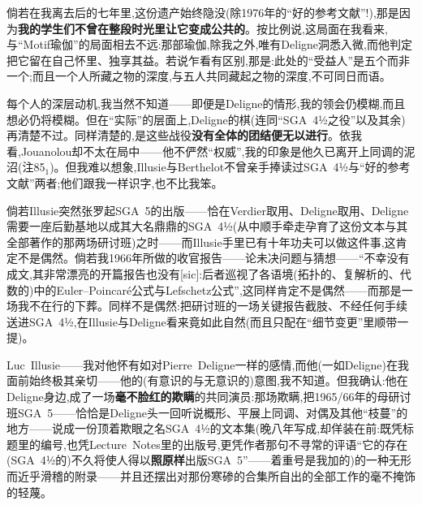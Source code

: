 倘若在我离去后的七年里,这份遗产始终隐没(除1976年的“好的参考文献”!),那是因为\textbf{我的学生们不曾在整段时光里让它变成公共的}。按比例说,这局面在我看来,与“Motif瑜伽”的局面相去不远:那部瑜伽,除我之外,唯有Deligne洞悉入微,而他判定把它留在自己怀里、独享其益。若说乍看有区别,那是:此处的“受益人”是五个而非一个;而且一个人所藏之物的深度,与五人共同藏起之物的深度,不可同日而语。

每个人的深层动机,我当然不知道——即便是Deligne的情形,我的领会仍模糊,而且想必仍将模糊。但在“实际”的层面上,Deligne的棋(连同“SGA~4½之役”以及其余)再清楚不过。同样清楚的,是这些战役\textbf{没有全体的团结便无以进行}。依我看,Jouanolou却不太在局中——他不俨然“权威”,我的印象是他久已离开上同调的泥沼(注85$_{1}$)。但我难以想象,Illusie与Berthelot不曾亲手捧读过SGA~4½与“好的参考文献”两者;他们跟我一样识字,也不比我笨。

倘若Illusie突然张罗起SGA~5的出版——恰在Verdier取用、Deligne取用、Deligne需要一座后勤基地以成其大名鼎鼎的SGA~4½(从中顺手牵走孕育了这份文本与其全部著作的那两场研讨班)之时——而Illusie手里已有十年功夫可以做这件事,这肯定不是偶然。倘若我1966年所做的收官报告——论未决问题与猜想——“不幸没有成文,其非常漂亮的开篇报告也没有[sic]:后者巡视了各语境(拓扑的、复解析的、代数的)中的Euler--Poincaré公式与Lefschetz公式”,这同样肯定不是偶然——而那是一场我不在行的下葬。同样不是偶然:把研讨班的一场关键报告截肢、不经任何手续送进SGA~4½,在Illusie与Deligne看来竟如此自然(而且只配在“细节变更”里顺带一提)。

Luc~Illusie——我对他怀有如对Pierre~Deligne一样的感情,而他(一如Deligne)在我面前始终极其亲切——他的(有意识的与无意识的)意图,我不知道。但我确认:他在Deligne身边,成了一场\textbf{毫不脸红的欺瞒}的共同演员:那场欺瞒,把1965/66年的母研讨班SGA~5——恰恰是Deligne头一回听说概形、平展上同调、对偶及其他“枝蔓”的地方——说成一份顶着欺眼之名SGA~4½的文本集(晚八年写成,却佯装在前:既凭标题里的编号,也凭Lecture~Notes里的出版号,更凭作者那句不寻常的评语“它的存在(SGA~4½的)不久将使人得以\textbf{照原样}出版SGA~5”——着重号是我加的)的一种无形而近乎滑稽的附录——并且还摆出对那份寒碜的合集所自出的全部工作的毫不掩饰的轻蔑。

